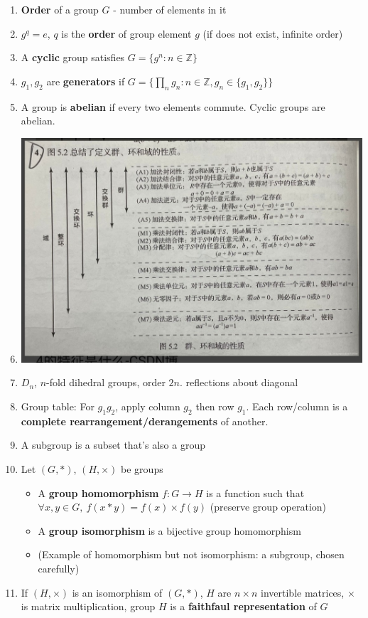 \documentclass{article}
\theoremstyle{remark}
\theoremstyle{remark}
\begin{document}
\begin{enumerate}
        \item \textbf{Order} of a group $G$ - number of elements in it
        \item $g^q=e$, $q$ is the \textbf{order} of group element $g$ (if does not exist, infinite order)
        \item A \textbf{cyclic} group satisfies $G=\{g^n:n\in\mathbb{Z}\}$
        \item $g_1,g_2$ are \textbf{generators} if $G=\{\prod_{n}g_n:n\in\mathbb{Z},g_n\in\{g_1,g_2\}\}$
        \item A group is \textbf{abelian} if every two elements commute. Cyclic groups are abelian.
        \item \includegraphics*[width=0.7\linewidth]{group_ring_field.jpg}
        \item $D_n$, $n$-fold dihedral groups, order $2n$. reflections about diagonal
        \item Group table: For $g_1g_2$, apply column $g_2$ then row $g_1$. Each row/column is a \textbf{complete rearrangement/derangements} of another.
        \item A subgroup is a subset that's also a group
        \item Let $(G,*)$, $(H,\times)$ be groups\begin{itemize}
            \item A \textbf{group homomorphism} $f:G\rightarrow H$ is a function such that $\forall x,y\in G,\ f(x*y)=f(x)\times f(y)$ (preserve group operation)
            \item A \textbf{group isomorphism} is a bijective group homomorphism
            \item (Example of homomorphism but not isomorphism: a subgroup, chosen carefully)
        \end{itemize}
        \item If $(H,\times)$ is an isomorphism of $(G,*)$, $H$ are $n\times n$ invertible matrices, $\times$ is matrix multiplication, group $H$ is a \textbf{faithfaul representation} of $G$

\end{enumerate}
\end{document}
